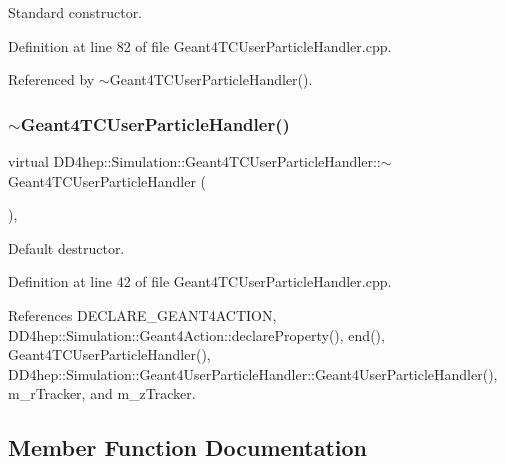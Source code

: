 Standard constructor. 



Definition at line 82 of file Geant4\+T\+C\+User\+Particle\+Handler.\+cpp.



Referenced by $\sim$\+Geant4\+T\+C\+User\+Particle\+Handler().

\hypertarget{class_d_d4hep_1_1_simulation_1_1_geant4_t_c_user_particle_handler_adcf43ca266894019172cb24712daa9d0}{}\label{class_d_d4hep_1_1_simulation_1_1_geant4_t_c_user_particle_handler_adcf43ca266894019172cb24712daa9d0} 
\subsubsection{\texorpdfstring{$\sim$\+Geant4\+T\+C\+User\+Particle\+Handler()}{~Geant4TCUserParticleHandler()}}
{\footnotesize\ttfamily virtual D\+D4hep\+::\+Simulation\+::\+Geant4\+T\+C\+User\+Particle\+Handler\+::$\sim$\+Geant4\+T\+C\+User\+Particle\+Handler (\begin{DoxyParamCaption}{ }\end{DoxyParamCaption})\hspace{0.3cm}{\ttfamily [inline]}, {\ttfamily [virtual]}}



Default destructor. 



Definition at line 42 of file Geant4\+T\+C\+User\+Particle\+Handler.\+cpp.



References D\+E\+C\+L\+A\+R\+E\+\_\+\+G\+E\+A\+N\+T4\+A\+C\+T\+I\+ON, D\+D4hep\+::\+Simulation\+::\+Geant4\+Action\+::declare\+Property(), end(), Geant4\+T\+C\+User\+Particle\+Handler(), D\+D4hep\+::\+Simulation\+::\+Geant4\+User\+Particle\+Handler\+::\+Geant4\+User\+Particle\+Handler(), m\+\_\+r\+Tracker, and m\+\_\+z\+Tracker.



\subsection{Member Function Documentation}
\hypertarget{class_d_d4hep_1_1_simulation_1_1_geant4_t_c_user_particle_handler_a1578be1e99f7f70c9d332cffb1ad2504}{}\label{class_d_d4hep_1_1_simulation_1_1_geant4_t_c_user_particle_handler_a1578be1e99f7f70c9d332cffb1ad2504} 
